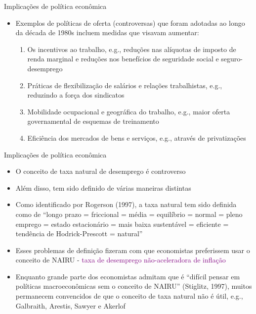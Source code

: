 \documentclass[10pt]{beamer}
\begin{document}
\begin{frame}{Implicações de política econômica}
    \begin{itemize}
        \item Exemplos de políticas de oferta (controversas) que foram adotadas ao longo da década de 1980s incluem medidas que visavam aumentar:
        \bigskip
        \begin{enumerate}
            \item Os incentivos ao trabalho, e.g., reduções nas alíquotas de imposto de renda marginal e reduções nos benefícios de seguridade social e seguro-desemprego
            \bigskip
            \item Práticas de flexibilização de salários e relações trabalhistas, e.g., reduzindo a força dos sindicatos
            \bigskip
            \item Mobilidade ocupacional e geográfica do trabalho, e.g., maior oferta governamental de esquemas de treinamento
            \bigskip
            \item Eficiência dos mercados de bens e serviços, e.g., através de privatizações
        \end{enumerate}
    \end{itemize}    
\end{frame}

\begin{frame}{Implicações de política econômica}
    \begin{itemize}
        \item O conceito de taxa natural de desemprego é controverso
        \bigskip
        \item Além disso, tem sido definido de várias maneiras distintas
        \bigskip
        \item Como identificado por Rogerson (1997), a taxa natural tem sido definida como de ``longo prazo = friccional = média = equilíbrio = normal = pleno emprego = estado estacionário = mais baixa sustentável = eficiente = tendência de Hodrick-Prescott = natural''
        \bigskip
        \item Esses problemas de definição fizeram com que economistas preferissem usar o conceito de NAIRU - \textcolor{purple}{taxa de desemprego não-aceleradora de inflação}
        \bigskip
        \item Enquanto grande parte dos economistas admitam que é ``difícil pensar em políticas macroeconômicas sem o conceito de NAIRU'' (Stiglitz, 1997), muitos permanecem convencidos de que o conceito de taxa natural não é útil, e.g., Galbraith, Arestis, Sawyer e Akerlof
    \end{itemize}    
\end{frame}
\end{document}
